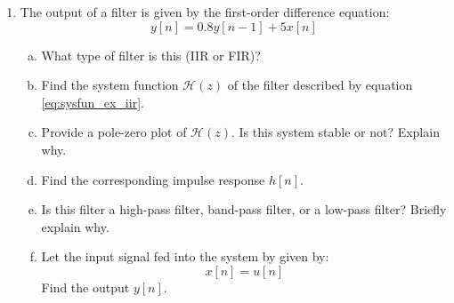 \begin{enumerate}
    \item The output of a filter is given by the first-order difference equation:
          \begin{equation}
              y[n]=0.8y[n-1]+5x[n]
              \label{eq:sysfun_ex_iir}
          \end{equation}
          \begin{enumerate}[a)]
              \item What type of filter is this (IIR or FIR)?
              \item Find the system function $\mathcal{H}(z)$ of the filter described by equation \ref{eq:sysfun_ex_iir}.
              \item Provide a pole-zero plot of $\mathcal{H}(z)$. Is this system stable or not? Explain why.
              \item Find the corresponding impulse response $h[n]$.
              \item Is this filter a high-pass filter, band-pass filter, or a low-pass filter? Briefly explain why.
              \item Let the input signal fed into the system by given by:
                    \begin{equation}
                        x[n]=u[n]
                    \end{equation}
                    Find the output $y[n]$.
          \end{enumerate}



\end{enumerate}
